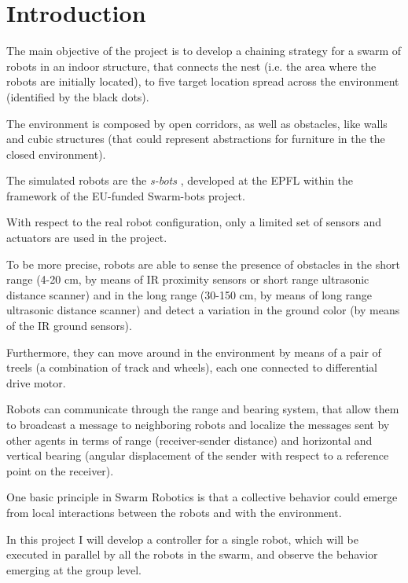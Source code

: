 \section{Introduction}\label{introduction}

The main objective of the project is to develop a chaining strategy for a swarm of robots in an indoor structure, that connects the nest (i.e. the area where the robots are initially located), to five target location spread across the environment (identified by the black dots).

The environment is composed by open corridors, as well as obstacles, like walls and cubic structures (that could represent abstractions for furniture in the the closed environment).

The simulated robots are the \emph{s-bots} \cite{mondada2003swarm}, developed at the EPFL within the framework of the EU-funded Swarm-bots project.

With respect to the real robot configuration, only a limited set of sensors and actuators are used in the project.

To be more precise, robots are able to sense the presence of obstacles in the short range (4-20 cm, by means of IR proximity sensors or short range ultrasonic distance scanner) and in the long range (30-150 cm, by means of long range ultrasonic distance scanner) and detect a variation in the ground color (by means of the IR ground sensors).

Furthermore, they can move around in the environment by means of a pair of treels (a combination of track and wheels), each one connected to differential drive motor.

Robots can communicate through the range and bearing system, that allow them to broadcast a message to neighboring robots and localize the messages sent by other agents in terms of range (receiver-sender distance) and horizontal and vertical bearing (angular displacement of the sender with respect to a reference point on the receiver).

One basic principle in Swarm Robotics is that a collective behavior could emerge from local interactions between the robots and with the environment.

In this project I will develop a controller for a single robot, which will be executed in parallel by all the robots in the swarm, and observe the behavior emerging at the group level.

